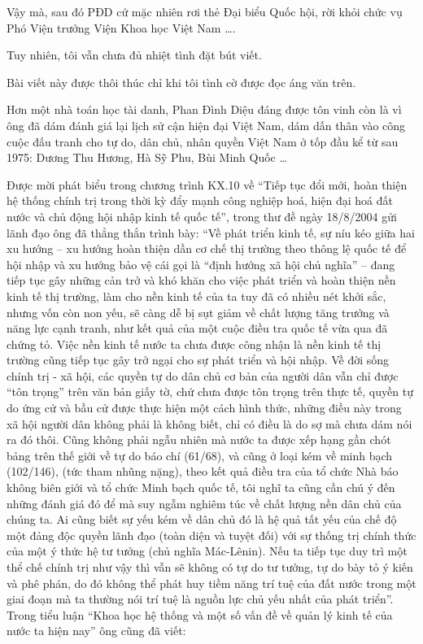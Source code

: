 Vậy mà, sau đó PĐD cứ mặc nhiên rơi thẻ Đại biểu Quốc hội, rời khỏi chức vụ Phó Viện trưởng Viện Khoa học Việt Nam …. 

Tuy nhiên, tôi vẫn chưa đủ nhiệt tình đặt bút viết.

Bài viết này được thôi thúc chỉ khi tôi tình cờ được đọc áng văn trên.

Hơn một nhà toán học tài danh, Phan Đình Diệu đáng được tôn vinh còn là vì ông đã dám đánh giá lại lịch sử cận hiện đại Việt Nam, dám dấn thân vào công cuộc đấu tranh cho tự do, dân chủ, nhân quyền Việt Nam ở tốp đầu kể từ sau 1975: Dương Thu Hương, Hà Sỹ Phu, Bùi Minh Quốc … 

Được mời phát biểu trong chương trình KX.10 về “Tiếp tục đổi mới, hoàn thiện hệ thống chính trị trong thời kỳ đẩy mạnh công nghiệp hoá, hiện đại hoá đất nước và chủ động hội nhập kinh tế quốc tế”, trong thư đề ngày 18/8/2004 gửi lãnh đạo ông đã thẳng thắn trình bày:
“Về phát triển kinh tế, sự níu kéo giữa hai xu hướng – xu hướng hoàn thiện dần cơ chế thị trường theo thông lệ quốc tế để hội nhập và xu hướng bảo vệ cái gọi là “định hướng xã hội chủ nghĩa” – đang tiếp tục gây những cản trở và khó khăn cho việc phát triển và hoàn thiện nền kinh tế thị trường, làm cho nền kinh tế của ta tuy đã có nhiều nét khởi sắc, nhưng vốn còn non yếu, sẽ càng dễ bị sụt giảm về chất lượng tăng trưởng và năng lực cạnh tranh, như kết quả của một cuộc điều tra quốc tế vừa qua đã chứng tỏ. Việc nền kinh tế nước ta chưa được công nhận là nền kinh tế thị trường cũng tiếp tục gây trở ngại cho sự phát triển và hội nhập. Về đời sống chính trị - xã hội, các quyền tự do dân chủ cơ bản của người dân vẫn chỉ được “tôn trọng” trên văn bản giấy tờ, chứ chưa được tôn trọng trên thực tế, quyền tự do ứng cử và bầu cử được thực hiện một cách hình thức, những điều này trong xã hội người dân không phải là không biết, chỉ có điều là do sợ mà chưa dám nói ra đó thôi. Cũng không phải ngẫu nhiên mà nước ta được xếp hạng gần chót bảng trên thế giới về tự do báo chí (61/68), và cũng ở loại kém về minh bạch (102/146), (tức tham nhũng nặng), theo kết quả điều tra của tổ chức Nhà báo không biên giới và tổ chức Minh bạch quốc tế, tôi nghĩ ta cũng cần chú ý đến những đánh giá đó để mà suy ngẫm nghiêm túc về chất lượng nền dân chủ của chúng ta. Ai cũng biết sự yếu kém về dân chủ đó là hệ quả tất yếu của chế độ một đảng độc quyền lãnh đạo (toàn diện và tuyệt đối) với sự thống trị chính thức của một ý thức hệ tư tưởng (chủ nghĩa Mác-Lênin). Nếu ta tiếp tục duy trì một thể chế chính trị như vậy thì vẫn sẽ không có tự do tư tưởng, tự do bày tỏ ý kiến và phê phán, do đó không thể phát huy tiềm năng trí tuệ của đất nước trong một giai đoạn mà ta thường nói trí tuệ là nguồn lực chủ yếu nhất của phát triển”.
Trong tiểu luận “Khoa học hệ thống và một số vấn đề về quản lý kinh tế của nước ta hiện nay” ông cũng đã viết:

